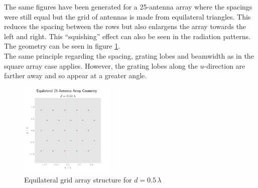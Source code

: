 
The same figures have been generated for a 25-antenna array where the spacings were still equal but the grid of antennas is made from equilateral triangles. This reduces the spacing between the rows but also enlargens the array towards the left and right. This ``squishing'' effect can also be seen in the radiation patterns. The geometry can be seen in figure \ref{fig:equilat-geometry}.\\

The same principle regarding the spacing, grating lobes and beamwidth as in the square array case applies. However, the grating lobes along the $u$-direction are farther away and so appear at a greater angle.

\begin{figure}[h]
    \centering
    \includegraphics[width=0.4\textwidth]{graphics/task_3/equilat-0.50-lambda-0.00-theta-0.00-phi-geometry.pdf}
    \caption{Equilateral grid array structure for $d=0.5\,\lambda$}\label{fig:equilat-geometry}
\end{figure}

